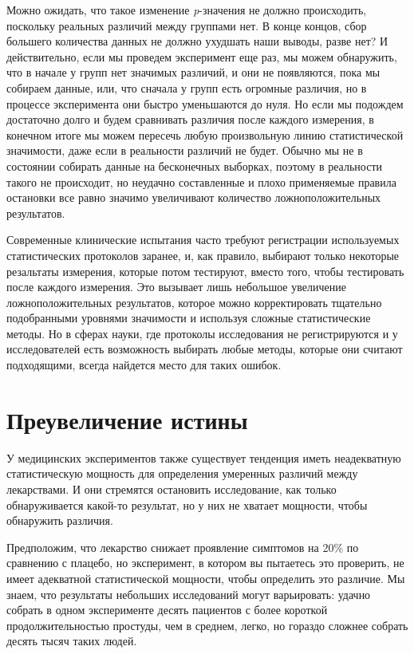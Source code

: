 Можно ожидать, что такое изменение \emph{p}-значения не должно происходить, поскольку реальных различий между группами нет. В конце концов, сбор большего количества данных не должно ухудшать наши выводы, разве нет? И действительно, если мы проведем эксперимент еще раз, мы можем обнаружить, что в начале у групп нет значимых различий, и они не появляются, пока мы собираем данные, или, что сначала у групп есть огромные различия, но в процессе эксперимента они быстро уменьшаются до нуля. Но если мы подождем достаточно долго и будем сравнивать различия после каждого измерения, в конечном итоге мы можем пересечь любую произвольную линию статистической значимости, даже если в реальности различий не будет. Обычно мы не в состоянии собирать данные на бесконечных выборках, поэтому в реальности такого не происходит, но неудачно  составленные и плохо применяемые правила остановки все равно значимо увеличивают количество ложноположительных результатов. \cite{simmons_false-positive_2011}  


Современные клинические испытания часто требуют регистрации используемых статистических протоколов заранее, и, как правило, выбирают только некоторые резальтаты измерения, которые потом тестируют, вместо того, чтобы тестировать после каждого измерения. Это вызывает лишь небольшое увеличение ложноположительных результатов, которое можно корректировать тщательно подобранными уровнями значимости и используя сложные статистические методы.\cite{todd_interim_2001} Но в сферах науки, где протоколы исследования не регистрируются и у исследователей есть возможность выбирать любые методы, которые они считают подходящими, всегда найдется место для таких ошибок.


\section{Преувеличение истины}
\label{chp7:truthinflation}

У медицинских экспериментов также существует тенденция иметь неадекватную статистическую мощность для определения умеренных различий между лекарствами. И они стремятся остановить исследование, как только обнаруживается какой-то результат, но у них не хватает мощности, чтобы обнаружить различия.

Предположим, что лекарство снижает проявление симптомов на 20\% по сравнению с плацебо, но эксперимент, в котором вы пытаетесь это проверить, не имеет адекватной статистической мощности, чтобы определить это различие. Мы знаем, что результаты небольших исследований могут варьировать: удачно собрать в одном эксперименте десять пациентов с более короткой продолжительностью простуды, чем в среднем, легко, но гораздо сложнее собрать десять тысяч таких людей.   

